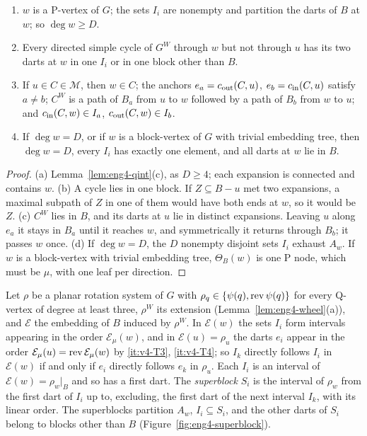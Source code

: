 \begin{lemma}\label{lem:eng4-pole}
\begin{enumerate}[label=(\alph*),nosep]
\item $w$ is a P-vertex of $G$; the sets $I_i$ are nonempty and partition
  the darts of $B$ at $w$; so $\deg w\ge D$.
\item Every directed simple cycle of $G^W$ through $w$ but not through $u$
  has its two darts at $w$ in one $I_i$ or in one block other than $B$.
\item If $u\in C\in\mathcal M$, then $w\in C$; the anchors
  $e_a=c_{\mathrm{out}}(C,u)$, $e_b=c_{\mathrm{in}}(C,u)$ satisfy $a\ne b$; $C^W$ is a path of
  $B_a$ from $u$ to $w$ followed by a path of $B_b$ from $w$ to $u$; and
  $c_{\mathrm{in}}(C,w)\in I_a$, $c_{\mathrm{out}}(C,w)\in I_b$.
\item If $\deg w=D$, or if $w$ is a block-vertex of $G$ with trivial
  embedding tree, then $\deg w=D$, every $I_i$ has exactly one element, and
  all darts at $w$ lie in $B$.
\end{enumerate}
\end{lemma}

\begin{proof}
(a) Lemma~\ref{lem:eng4-qint}(c), as $D\ge4$; each expansion is connected
and contains $w$. (b) A cycle lies in one block. If $Z\subseteq B-u$ met
two expansions, a maximal subpath of $Z$ in one of them would have both ends
at $w$, so it would be $Z$. (c) $C^W$ lies in $B$, and its darts at $u$ lie
in distinct expansions. Leaving $u$ along $e_a$ it stays in $B_a$ until it
reaches $w$, and symmetrically it returns through $B_b$; it passes $w$ once.
(d) If $\deg w=D$, the $D$ nonempty disjoint sets $I_i$ exhaust $A_w$. If
$w$ is a block-vertex with trivial embedding tree, $\Theta_B(w)$ is one P
node, which must be $\mu$, with one leaf per direction.
\end{proof}

Let $\rho$ be a planar rotation system of $G$ with
$\rho_q\in\{\psi(q),\operatorname{rev}\psi(q)\}$ for every Q-vertex of degree at least
three, $\rho^W$ its extension (Lemma~\ref{lem:eng4-wheel}(a)), and
$\mathcal E$ the embedding of $B$ induced by $\rho^W$. In $\mathcal E(w)$ the
sets $I_i$ form intervals appearing in the order $\mathcal E_\mu(w)$, and in
$\mathcal E(u)=\rho_u$ the darts $e_i$ appear in the order $\mathcal
E_\mu(u)=\operatorname{rev}\mathcal E_\mu(w)$ by \ref{it:v4-T3}, \ref{it:v4-T4}; so $I_k$
directly follows $I_i$ in $\mathcal E(w)$ if and only if $e_i$ directly
follows $e_k$ in $\rho_u$. Each $I_i$ is an interval of
$\mathcal E(w)=\rho_w|_{B}$ and so has a first dart. The \emph{superblock}
$S_i$ is the interval of $\rho_w$ from the first dart of $I_i$ up to,
excluding, the first dart of the next interval $I_k$, with its linear order.
The superblocks partition $A_w$, $I_i\subseteq S_i$, and the other darts of
$S_i$ belong to blocks other than $B$ (Figure~\ref{fig:eng4-superblock}).

